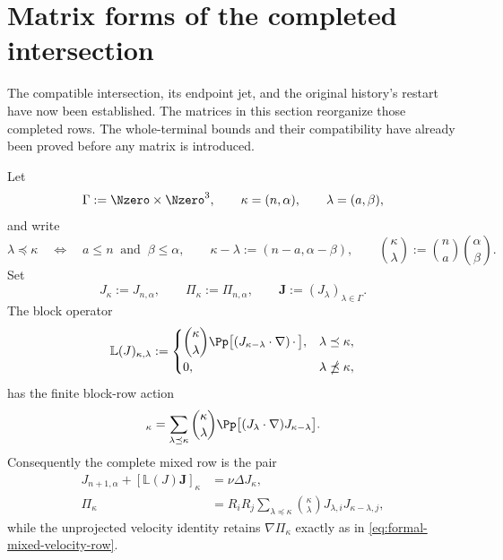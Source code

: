 \section{Matrix forms of the completed intersection}
\label{sec:matrix-forms}

The compatible intersection, its endpoint jet, and the original history's restart
have now been established.  The matrices in this section reorganize those
completed rows.  The whole-terminal bounds and their compatibility have
already been proved before any matrix is introduced.

\begin{proposition}
\label{prop:formal-mixed-index-matrix}
Let
\[
 \Gamma:=\Nzero\times\Nzero^3,
 \qquad
 \kappa=(n,\alpha),
 \qquad
 \lambda=(a,\beta),
\]
and write
\[
 \lambda\preceq\kappa
 \quad\Longleftrightarrow\quad
 a\le n\ \text{ and }\ \beta\le\alpha,
 \qquad
 \kappa-\lambda:=(n-a,\alpha-\beta),
 \qquad
 \binom\kappa\lambda:=\binom na\binom\alpha\beta.
\]
Set
\[
 J_\kappa:=J_{n,\alpha},
 \qquad
 \Pi_\kappa:=\Pi_{n,\alpha},
 \qquad
 \mathbf J:=(J_\lambda)_{\lambda\in\Gamma}.
\]
The block operator
\begin{equation}
 \mathbb L(J)_{\kappa,\lambda}
 :=
 \begin{cases}
 \displaystyle
 \binom\kappa\lambda
 \Pp\bigl[(J_{\kappa-\lambda}\cdot\nabla)\,\mathord\cdot\,\bigr],
 &\lambda\preceq\kappa,\\[6pt]
 0,&\lambda\npreceq\kappa,
 \end{cases}
 \label{eq:formal-mixed-transport-matrix}
\end{equation}
has the finite block-row action
\begin{equation}
 [\mathbb L(J)\mathbf J]_\kappa
 =\sum_{\lambda\preceq\kappa}\binom\kappa\lambda
   \Pp\bigl[(J_\lambda\cdot\nabla)J_{\kappa-\lambda}\bigr].
 \label{eq:formal-mixed-transport-row}
\end{equation}
Consequently the complete mixed row is the pair
\begin{align}
 J_{n+1,\alpha}+[\mathbb L(J)\mathbf J]_\kappa
 &=\nu\Delta J_\kappa,
 \label{eq:formal-mixed-projected-matrix-row}\\
 \Pi_\kappa
 &=R_iR_j\sum_{\lambda\preceq\kappa}\binom\kappa\lambda
   J_{\lambda,i}J_{\kappa-\lambda,j},
 \label{eq:formal-mixed-matrix-pressure-row}
\end{align}
while the unprojected velocity identity retains
\(\nabla\Pi_\kappa\) exactly as in
\eqref{eq:formal-mixed-velocity-row}.


\end{proposition}
